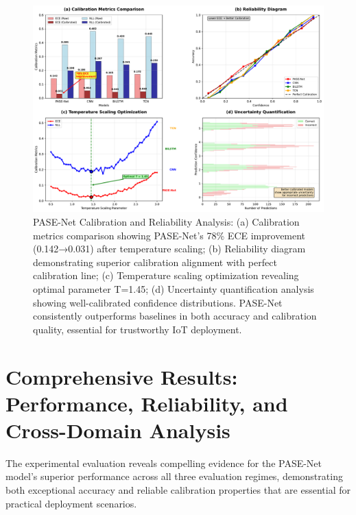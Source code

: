 \documentclass[journal]{IEEEtran}
\begin{document}
\begin{figure}[t]
\centering
\includegraphics[width=\columnwidth]{plots/fig4_calibration.pdf}
\caption{PASE-Net Calibration and Reliability Analysis: (a) Calibration metrics comparison showing PASE-Net's 78\% ECE improvement (0.142→0.031) after temperature scaling; (b) Reliability diagram demonstrating superior calibration alignment with perfect calibration line; (c) Temperature scaling optimization revealing optimal parameter T=1.45; (d) Uncertainty quantification analysis showing well-calibrated confidence distributions. PASE-Net consistently outperforms baselines in both accuracy and calibration quality, essential for trustworthy IoT deployment.}
\label{fig:calibration}
\end{figure}

\section{Comprehensive Results: Performance, Reliability, and Cross-Domain Analysis}

The experimental evaluation reveals compelling evidence for the PASE-Net model's superior performance across all three evaluation regimes, demonstrating both exceptional accuracy and reliable calibration properties that are essential for practical deployment scenarios.
\end{document}
